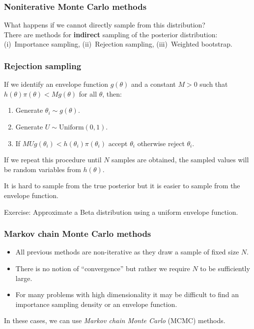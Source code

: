 \documentclass{beamer}
\newcommand{\1}{\ensuremath{\mathbf{1}}}
\begin{document}
%
%
%
\begin{frame}\frametitle{Noniterative Monte Carlo methods}
	What happens if we cannot directly sample from this distribution?\\
	There are methods for \textbf{indirect} sampling of the posterior distribution: (i)~Importance sampling, (ii)~Rejection sampling, (iii)~Weighted bootstrap.
\end{frame}
%
%
%
\begin{frame}\frametitle{Rejection sampling}
	If we identify an envelope function $g(\theta)$ and a constant $M > 0$ such that $h(\theta)\pi(\theta) < Mg(\theta)$ for all $\theta$, then:
	\begin{enumerate}
		\item Generate $\theta_i \sim g(\theta)$.
		\item Generate $U \sim \text{Uniform}(0, 1)$.
		\item If $MUg(\theta_i) < h(\theta_i)\pi(\theta_i)$ accept $\theta_i$ otherwise reject $\theta_i$.
	\end{enumerate}
	If we repeat this procedure until $N$ samples are obtained, the sampled values will be random variables from $h(\theta)$.
	\begin{block}{}
		It is hard to sample from the true posterior but it is easier to sample from the envelope function.
	\end{block}
	Exercise: Approximate a Beta distribution using a uniform envelope function.
\end{frame}
%
%
%
\begin{frame}\frametitle{Markov chain Monte Carlo methods}
	\begin{itemize}
		\item All previous methods are non-iterative as they draw a sample of fixed size $N$.
		\item There is no notion of ``convergence'' but rather we require $N$ to be sufficiently large.
		\item For many problems with high dimensionality it may be difficult to find an importance sampling density or an envelope function.
	\end{itemize}
	In these cases, we can use \emph{Markov chain Monte Carlo} (MCMC) methods.
\end{frame}
\end{document}
